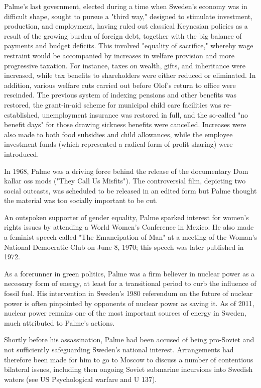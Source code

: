 Palme's last government, elected during a time when Sweden's economy was
in difficult shape, sought to pursue a "third way," designed to
stimulate investment, production, and employment, having ruled out
classical Keynesian policies as a result of the growing burden of
foreign debt, together with the big balance of payments and budget
deficits. This involved "equality of sacrifice," whereby wage restraint
would be accompanied by increases in welfare provision and more
progressive taxation. For instance, taxes on wealth, gifts, and
inheritance were increased, while tax benefits to shareholders were
either reduced or eliminated. In addition, various welfare cuts carried
out before Olof's return to office were rescinded. The previous system
of indexing pensions and other benefits was restored, the grant-in-aid
scheme for municipal child care facilities was re-established,
unemployment insurance was restored in full, and the so-called "no
benefit days" for those drawing sickness benefits were cancelled.
Increases were also made to both food subsidies and child allowances,
while the employee investment funds (which represented a radical form of
profit-sharing) were introduced.

In 1968, Palme was a driving force behind the release of the documentary
Dom kallar oss mods ("They Call Us Misfits"). The controversial film,
depicting two social outcasts, was scheduled to be released in an edited
form but Palme thought the material was too socially important to be
cut.

An outspoken supporter of gender equality, Palme sparked interest for
women's rights issues by attending a World Women's Conference in Mexico.
He also made a feminist speech called "The Emancipation of Man" at a
meeting of the Woman's National Democratic Club on June 8, 1970; this
speech was later published in 1972.

As a forerunner in green politics, Palme was a firm believer in nuclear
power as a necessary form of energy, at least for a transitional period
to curb the influence of fossil fuel. His intervention in Sweden's 1980
referendum on the future of nuclear power is often pinpointed by
opponents of nuclear power as saving it. As of 2011, nuclear power
remains one of the most important sources of energy in Sweden, much
attributed to Palme's actions.

Shortly before his assassination, Palme had been accused of being
pro-Soviet and not sufficiently safeguarding Sweden's national interest.
Arrangements had therefore been made for him to go to Moscow to discuss
a number of contentious bilateral issues, including then ongoing Soviet
submarine incursions into Swedish waters (see US Psychological warfare
and U 137).

